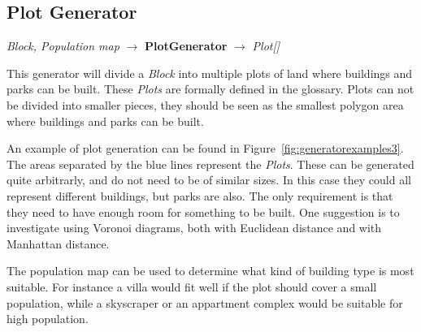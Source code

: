 \subsection{Plot Generator}
\begin{center}
    \textit{Block, Population map} $\rightarrow$ \textbf{PlotGenerator} $\rightarrow$ \textit{Plot{[}{]}}
\end{center}
This generator will divide a \textit{Block} into multiple plots of land where buildings and parks can be built.
These \textit{Plots} are formally defined in the glossary.
Plots can not be divided into smaller pieces, they should be seen as the smallest polygon area where buildings and parks can be built.

An example of plot generation can be found in Figure~\ref{fig:generatorexamples3}.
The areas separated by the blue lines represent the \textit{Plots}.
These can be generated quite arbitrarly, and do not need to be of similar sizes.
In this case they could all represent different buildings, but parks are also.
The only requirement is that they need to have enough room for something to be built.
One suggestion is to investigate using Voronoi diagrams, both with Euclidean distance and with Manhattan distance.

The population map can be used to determine what kind of building type is most suitable.
For instance a villa would fit well if the plot should cover a small population, while a skyscraper or an appartment complex would be suitable for high population.
